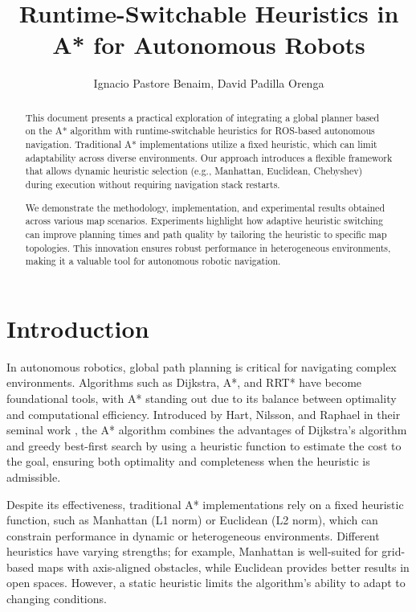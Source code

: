 \documentclass[letterpaper, 10 pt, conference]{ieeeconf}
\title{\LARGE\bf Runtime-Switchable Heuristics in A* for Autonomous Robots}
\author{\centering Ignacio Pastore Benaim, David Padilla Orenga}
\begin{document}
\setlength{\parskip}{0.5em} %
\maketitle

\begin{abstract}
This document presents a practical exploration of integrating a global planner based on the A* algorithm with runtime-switchable heuristics for ROS-based autonomous navigation. Traditional A* implementations utilize a fixed heuristic, which can limit adaptability across diverse environments. Our approach introduces a flexible framework that allows dynamic heuristic selection (e.g., Manhattan, Euclidean, Chebyshev) during execution without requiring navigation stack restarts.

We demonstrate the methodology, implementation, and experimental results obtained across various map scenarios. Experiments highlight how adaptive heuristic switching can improve planning times and path quality by tailoring the heuristic to specific map topologies. This innovation ensures robust performance in heterogeneous environments, making it a valuable tool for autonomous robotic navigation.
\end{abstract}


\section{Introduction}\label{sec:intro}

In autonomous robotics, global path planning is critical for navigating complex environments. Algorithms such as Dijkstra, A*, and RRT* have become foundational tools, with A* standing out due to its balance between optimality and computational efficiency. Introduced by Hart, Nilsson, and Raphael in their seminal work \cite{hart1968formal}, the A* algorithm combines the advantages of Dijkstra's algorithm and greedy best-first search by using a heuristic function to estimate the cost to the goal, ensuring both optimality and completeness when the heuristic is admissible.

Despite its effectiveness, traditional A* implementations rely on a fixed heuristic function, such as Manhattan (L1 norm) or Euclidean (L2 norm), which can constrain performance in dynamic or heterogeneous environments. Different heuristics have varying strengths; for example, Manhattan is well-suited for grid-based maps with axis-aligned obstacles, while Euclidean provides better results in open spaces. However, a static heuristic limits the algorithm's ability to adapt to changing conditions.
\end{document}
